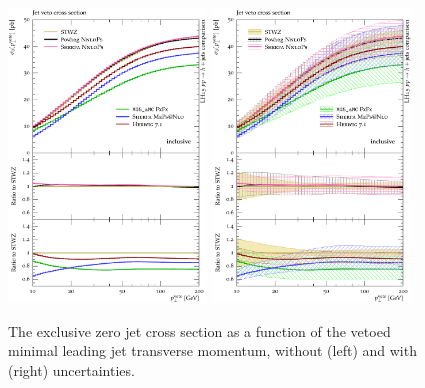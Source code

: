 {\begin{figure}[t!]
  \centering
  \includegraphics[width=0.47\textwidth]{figures/hjetscomp_u_xs_jet_veto_j0.pdf}
  \hfill
  \includegraphics[width=0.47\textwidth]{figures/hjetscomp_xs_jet_veto_j0.pdf}
  \caption{
    The exclusive zero jet cross section as a function of 
    the vetoed minimal leading jet transverse momentum,
    without (left) and with (right) uncertainties.
    \label{fig:hjetscomp:results:jvobs:jvxs0}
  }
\end{figure}

}
